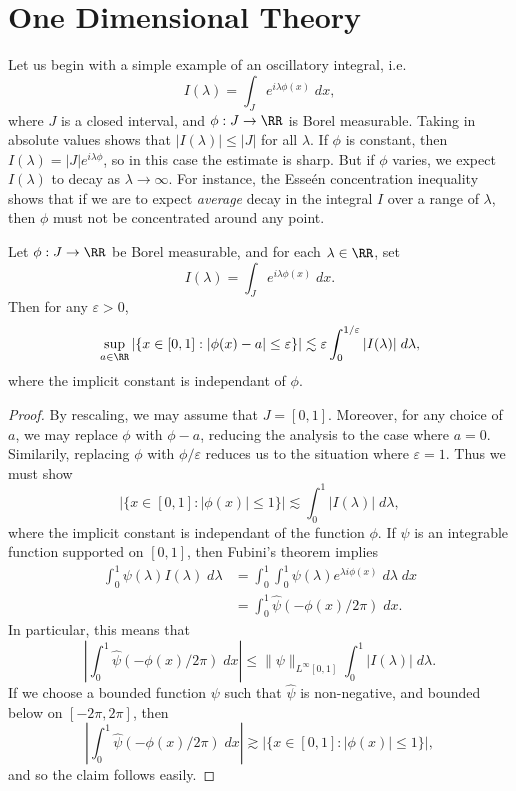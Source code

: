 \section{One Dimensional Theory}

Let us begin with a simple example of an oscillatory integral, i.e.
%
\[ I(\lambda) = \int_J e^{i \lambda \phi(x)}\; dx, \]
%
where $J$ is a closed interval, and $\phi: J \to \RR$ is Borel measurable. Taking in absolute values shows that $|I(\lambda)| \leq |J|$ for all $\lambda$. If $\phi$ is constant, then $I(\lambda) = |J| e^{i \lambda \phi}$, so in this case the estimate is sharp. But if $\phi$ varies, we expect $I(\lambda)$ to decay as $\lambda \to \infty$. For instance, the Esse\'{e}n concentration inequality shows that if we are to expect \emph{average} decay in the integral $I$ over a range of $\lambda$, then $\phi$ must not be concentrated around any point.

\begin{theorem}
  Let $\phi: J \to \RR$ be Borel measurable, and for each $\lambda \in \RR$, set
  \[ I(\lambda) = \int_J e^{i \lambda \phi(x)}\; dx. \]
  Then for any $\varepsilon > 0$,
  \[ \sup_{a \in \RR} |\{ x \in [0,1]: |\phi(x) - a| \leq \varepsilon \}| \lesssim \varepsilon \int_0^{1/\varepsilon} |I(\lambda)|\; d\lambda, \]
  where the implicit constant is independant of $\phi$.
\end{theorem}
\begin{proof}
  By rescaling, we may assume that $J = [0,1]$. Moreover, for any choice of $a$, we may replace $\phi$ with $\phi - a$, reducing the analysis to the case where $a = 0$. Similarily, replacing $\phi$ with $\phi/\varepsilon$ reduces us to the situation where $\varepsilon = 1$. Thus we must show
  \[ |\{ x \in [0,1]: |\phi(x)| \leq 1 \}| \lesssim \int_0^1 |I(\lambda)|\; d\lambda, \]
  where the implicit constant is independant of the function $\phi$. If $\psi$ is an integrable function supported on $[0,1]$, then Fubini's theorem implies
  \begin{align*}
    \int_0^1 \psi(\lambda) I(\lambda)\; d\lambda &= \int_0^1 \int_0^1 \psi(\lambda) e^{\lambda i \phi(x)}\; d\lambda\; dx\\
    &= \int_0^1 \widehat{\psi}(- \phi(x) / 2 \pi)\; dx.
  \end{align*}
  In particular, this means that
  \[ \left| \int_0^1 \widehat{\psi}(- \phi(x) / 2\pi)\; dx \right| \leq \| \psi \|_{L^\infty[0,1]} \int_0^1 |I(\lambda)|\; d\lambda. \]
  If we choose a bounded function $\psi$ such that $\widehat{\psi}$ is non-negative, and bounded below on $[-2\pi,2\pi]$, then
  \[ \left| \int_0^1 \widehat{\psi}(- \phi(x) / 2 \pi)\; dx \right| \gtrsim |\{ x \in [0,1]: |\phi(x)| \leq 1 \}|, \]
  and so the claim follows easily.
\end{proof}

